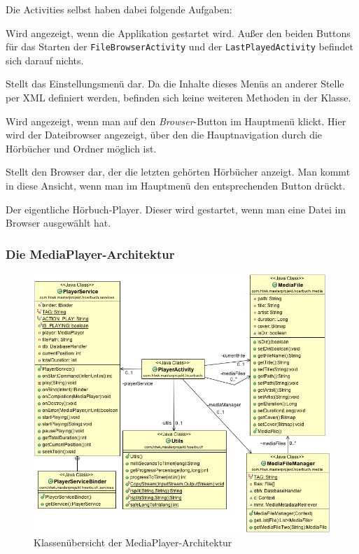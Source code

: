 Die Activities selbst haben dabei folgende Aufgaben:

\begin{description}[style=nextline]
	\item[MainActivity] Wird angezeigt, wenn die Applikation gestartet wird. Außer den beiden Buttons für das Starten der \verb+FileBrowserActivity+ und der \verb+LastPlayedActivity+ befindet sich darauf nichts.
	\item[SettingsActivity] Stellt das Einstellungsmenü dar. Da die Inhalte dieses Menüs an anderer Stelle per XML definiert werden, befinden sich keine weiteren Methoden in der Klasse.
	\item[FileBrowserActivity] Wird angezeigt, wenn man auf den \emph{Browser}-Button im Hauptmenü klickt. Hier wird der Dateibrowser angezeigt, über den die Hauptnavigation durch die Hörbücher und Ordner möglich ist.
	\item[LastPlayedActivity] Stellt den Browser dar, der die letzten gehörten Hörbücher anzeigt. Man kommt in diese Ansicht, wenn man im Hauptmenü den entsprechenden Button drückt.
	\item[PlayerActivity] Der eigentliche Hörbuch-Player. Dieser wird gestartet, wenn man eine Datei im Browser ausgewählt hat.
\end{description}

\subsubsection{Die MediaPlayer-Architektur}

\begin{figure}[ht!]
\begin{center}
\includegraphics[scale=.5]{images/cd_media}
\caption{Klassenübersicht der MediaPlayer-Architektur}
\label{cd_media}
\end{center}
\end{figure}

